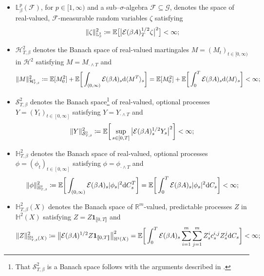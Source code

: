 \documentclass[10pt]{article} %
\newcommand\cE{\mathcal E}
\newcommand\cF{\mathcal F}
\newcommand\cG{\mathcal G}
\newcommand\cH{\mathcal H}
\newcommand\cS{\mathcal S}
\newcommand{\smalltext}[1]{\text{\fontsize{4}{4}\selectfont$#1$}}
\def \E{\mathbb{E}}
\def \H{\mathbb{H}}
\def \L{\mathbb{L}}
\def \R{\mathbb{R}}
\newcommand{\1}{\mathbf{1}}
\def\d{\mathrm{d}}
\begin{document}
\begin{itemize}[leftmargin=0.9cm]
	\item $\L^p_\beta(\cF)$, for $p \in [1,\infty)$ and a sub--$\sigma$-algebra $\cF \subseteq \cG$, denotes the space of real-valued, $\cF$-measurable random variables $\zeta$ satisfying 
	\[
	\|\zeta\|^{2}_{\L^{\smalltext{2}}_{\smalltext{\beta}}} \coloneqq \E\big[\big|\cE(\beta A)^{1/2}_T\zeta\big|^2\big] < \infty;
	\]
	\item $\cH^2_{T,\beta}$ denotes the Banach space of real-valued martingales $M = (M_t)_{t \in [0,\infty)}$ in $\cH^2$ satisfying $M = M_{\cdot \land T}$ and 
	\[
	\|M\|^2_{\cH^{\smalltext{2}}_{\smalltext{T}\smalltext{,}\smalltext{\beta}}} \coloneqq \E[M^2_0] + \E\bigg[\int_{(0,\infty)} \cE(\beta A)_s \d \langle M^T \rangle_s\bigg] = \E[M^2_0] + \E\bigg[\int_0^T \cE(\beta A)_s \d \langle M \rangle_s\bigg] < \infty;
	\]
	\item $\cS^2_{T,\beta}$ denotes the Banach space\footnote{That $\cS^2_{T,\beta}$ is a Banach space follows with the arguments described in \cite[IV.21, pp. 82--83]{dellacherie1982probabilities}.} of real-valued, optional processes $Y = (Y_t)_{t \in [0,\infty]}$ satisfying $Y = Y_{\cdot \land T}$ and
		\begin{equation*}
			\|Y\|^2_{\cS^{\smalltext{2}}_{\smalltext{T}\smalltext{,}\smalltext{\beta}}} \coloneqq \E \bigg[ \sup_{s \in [0,T]} \big| \cE(\beta A)^{1/2}_s Y_s \big|^2\bigg] < \infty;
		\end{equation*}
	\item $\H^2_{T,\beta}$ denotes the Banach space of real-valued, optional processes $\phi = (\phi_t)_{t \in [0,\infty]}$ satisfying $\phi = \phi_{\cdot \land T}$ and
		\begin{equation*}
			\|\phi\|^2_{\H^{\smalltext{2}}_{\smalltext{T}\smalltext{,}\smalltext{\beta}}} \coloneqq \E \bigg[ \int_{(0,\infty)} \cE(\beta A)_s |\phi_s|^2 \d C^T_s\bigg] = \E \bigg[ \int_0^T \cE(\beta A)_s |\phi_s|^2 \d C_s\bigg] < \infty;
		\end{equation*}
	\item $\H^2_{T,\beta}(X)$ denotes the Banach space of $\R^m$-valued, predictable processes $Z$ in $\H^2(X)$ satisfying $Z = Z \mathbf{1}_{\llbracket 0, T \rrbracket}$ and
		\begin{equation*}
			\|Z\|^2_{\H^\smalltext{2}_{\smalltext{T}\smalltext{,}\smalltext{\beta}}(X)} \coloneqq \big\|\cE(\beta A)^{1/2}Z\mathbf{1}_{\llbracket 0, T\rrbracket}\big\|^2_{\H^\smalltext{2}(X)} = \E\bigg[\int_0^T \cE(\beta A)_s \sum_{i=1}^m\sum_{j=1}^m Z^i_s c^{i,j}_s Z^j_s \d C_s\bigg] < \infty;

\end{equation*}
\end{itemize}
\end{document}
